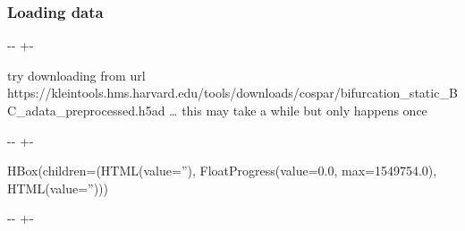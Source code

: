 \documentclass[letterpaper,10pt,english]{sphinxmanual}
\newlength\nbsphinxcodecellspacing
\begin{document}
\subsubsection{Loading data}
\label{\detokenize{20210120-Bifurcation_model_static_barcoding:Loading-data}}
{
\begin{sphinxVerbatim}[commandchars=\\\{\}]
\llap{\color{nbsphinxin}[2]:\,\hspace{\fboxrule}\hspace{\fboxsep}}
\end{sphinxVerbatim}
}

{

\kern-\sphinxverbatimsmallskipamount\kern-\baselineskip
\kern+\FrameHeightAdjust\kern-\fboxrule
\vspace{\nbsphinxcodecellspacing}

\begin{sphinxVerbatim}[commandchars=\\\{\}]
try downloading from url
https://kleintools.hms.harvard.edu/tools/downloads/cospar/bifurcation\_static\_BC\_adata\_preprocessed.h5ad
{\ldots} this may take a while but only happens once
\end{sphinxVerbatim}
}

{

\kern-\sphinxverbatimsmallskipamount\kern-\baselineskip
\kern+\FrameHeightAdjust\kern-\fboxrule
\vspace{\nbsphinxcodecellspacing}

\begin{sphinxVerbatim}[commandchars=\\\{\}]
HBox(children=(HTML(value=''), FloatProgress(value=0.0, max=1549754.0), HTML(value='')))
\end{sphinxVerbatim}
}

{

\kern-\sphinxverbatimsmallskipamount\kern-\baselineskip
\kern+\FrameHeightAdjust\kern-\fboxrule
\vspace{\nbsphinxcodecellspacing}

\begin{sphinxVerbatim}[commandchars=\\\{\}]

\end{sphinxVerbatim}
}
\end{document}
